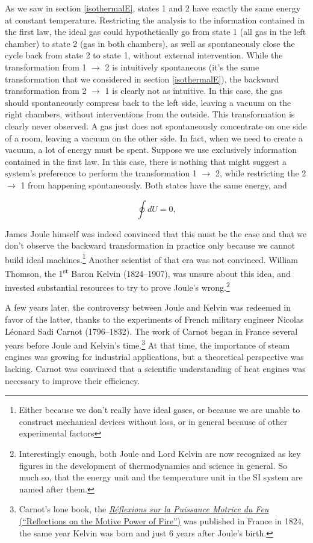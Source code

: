 \documentclass[
  9pt,
]{extbook}
\theoremstyle{definition}
\theoremstyle{definition}
\theoremstyle{definition}
\theoremstyle{definition}
\theoremstyle{remark}
\begin{document}
As we saw in section \ref{isothermalE}, states 1 and 2 have exactly the same energy at constant temperature. Restricting the analysis to the information contained in the first law, the ideal gas could hypothetically go from state 1 (all gas in the left chamber) to state 2 (gas in both chambers), as well as spontaneously close the cycle back from state 2 to state 1, without external intervention. While the transformation from 1 \(\rightarrow\) 2 is intuitively spontaneous (it's the same transformation that we considered in section \ref{isothermalE}), the backward transformation from 2 \(\rightarrow\) 1 is clearly not as intuitive. In this case, the gas should spontaneously compress back to the left side, leaving a vacuum on the right chambers, without interventions from the outside. This transformation is clearly never observed. A gas just does not spontaneously concentrate on one side of a room, leaving a vacuum on the other side. In fact, when we need to create a vacuum, a lot of energy must be spent. Suppose we use exclusively information contained in the first law. In this case, there is nothing that might suggest a system's preference to perform the transformation 1 \(\rightarrow\) 2, while restricting the 2 \(\rightarrow\) 1 from happening spontaneously. Both states have the same energy, and

\begin{equation}
  \oint dU=0,
  \label{eq:de0c}
\end{equation}

James Joule himself was indeed convinced that this must be the case and that we don't observe the backward transformation in practice only because we cannot build ideal machines.\footnote{Either because we don't really have ideal gases, or because we are unable to construct mechanical devices without loss, or in general because of other experimental factors} Another scientist of that era was not convinced. William Thomson, the 1\textsuperscript{st} Baron Kelvin (1824--1907), was unsure about this idea, and invested substantial resources to try to prove Joule's wrong.\footnote{Interestingly enough, both Joule and Lord Kelvin are now recognized as key figures in the development of thermodynamics and science in general. So much so, that the energy unit and the temperature unit in the SI system are named after them.}

A few years later, the controversy between Joule and Kelvin was redeemed in favor of the latter, thanks to the experiments of French military engineer Nicolas Léonard Sadi Carnot (1796--1832). The work of Carnot began in France several years before Joule and Kelvin's time.\footnote{Carnot's lone book, the \href{https://en.wikipedia.org/wiki/Reflections_on_the_Motive_Power_of_Fire}{\emph{Réflexions sur la Puissance Motrice du Feu} (``Reflections on the Motive Power of Fire'')} was published in France in 1824, the same year Kelvin was born and just 6 years after Joule's birth.} At that time, the importance of steam engines was growing for industrial applications, but a theoretical perspective was lacking. Carnot was convinced that a scientific understanding of heat engines was necessary to improve their efficiency.
\end{document}
